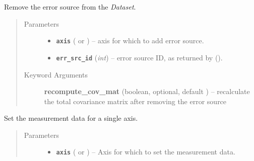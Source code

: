 \documentclass[a4paper,10pt,english]{sphinxmanual}
\begin{document}
\begin{fulllineitems}
\begin{fulllineitems}
\begin{quote}
\begin{description}
\end{description}\end{quote}

\end{fulllineitems}


\begin{fulllineitems}
\label{module_doc:kafe.dataset.Dataset.remove_error_source}
Remove the error source from the \emph{Dataset}.
\begin{quote}\begin{description}
\item[{Parameters}] \leavevmode\begin{itemize}
\item {} 
\textbf{\texttt{axis}} ( or ) -- axis for which to add error source.

\item {} 
\textbf{\texttt{err\_src\_id}} (\emph{int}) -- error source ID, as returned by
{\hyperref[module_doc:kafe.dataset.Dataset.add_error_source]{\emph{}}} ().

\end{itemize}

\item[{Keyword Arguments}] \leavevmode
\textbf{recompute\_cov\_mat} (boolean, optional, default ) --
recalculate the total covariance matrix after removing the error
source

\end{description}\end{quote}

\end{fulllineitems}


\begin{fulllineitems}
\label{module_doc:kafe.dataset.Dataset.set_axis_data}
Set the measurement data for a single axis.
\begin{quote}\begin{description}
\item[{Parameters}] \leavevmode\begin{itemize}
\item {} 
\textbf{\texttt{axis}} ( or ) -- Axis for which to set the measurement data.


\end{itemize}
\end{description}
\end{quote}
\end{fulllineitems}
\end{fulllineitems}
\end{document}
